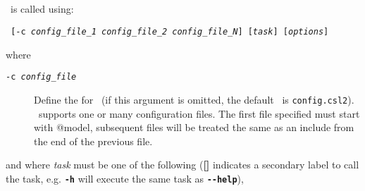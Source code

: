 \subsection{\label{sec:CommandLineArguments}}

\CNAME\ is called using:

\texttt{\cname\ [-c \emph{config\_file_1} \emph{config\_file_2} \emph{config\_file_N}] [\emph{task}] [\emph{options}]}

where

\begin{description}
  \item [\texttt{-c \emph{config\_file}}] Define the \config for \CNAME\ (if this argument is omitted, the default \config\ is \texttt{config.csl2}).
  \CNAME\ supports one or many configuration files. The first file specified must start with @model, subsequent files will be treated the same as an include from the end of the previous file.
\end{description}

and where \emph{task} must be one of the following (\textbf{[]} indicates a secondary label to call the task, e.g. \textbf{\texttt{-h}} will execute the same task as \textbf{\texttt{-{}-help}}),

